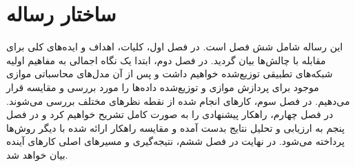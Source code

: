 \section{ساختار رساله}
این رساله شامل شش فصل است. در فصل اول، کلیات، اهداف و ایده‌های کلی برای مقابله با چالش‌ها بیان گردید. در فصل دوم، ابتدا یک نگاه اجمالی به مفاهیم اولیه شبکه‌های تطبیقی توزیع‌شده خواهیم داشت و پس از آن مدل‌های محاسباتی موازی موجود برای پردازش موازی و توزیع‌شده داده‌ها را مورد بررسی و مقایسه قرار می‌دهیم. در فصل سوم، کارهای انجام شده از نقطه نظرهای مختلف بررسی  می‌شوند. در فصل چهارم، راهکار پیشنهادی را به صورت کامل تشریح خواهیم کرد و در فصل پنجم به ارزیابی و تحلیل نتایج بدست آمده و مقایسه راهکار ارائه شده با دیگر روش‌ها پرداخته می‌شود. در نهایت در فصل ششم، نتیجه‌گیری و مسیرهای اصلی کارهای آینده بیان خواهد شد.
